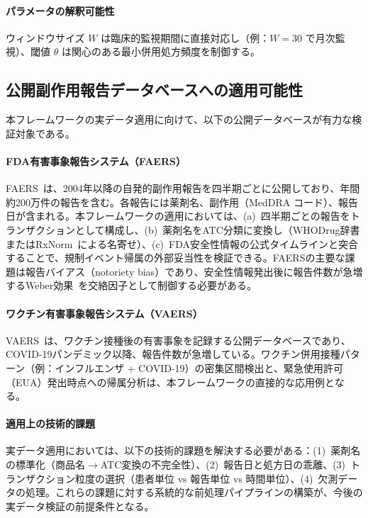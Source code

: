 \documentclass[11pt]{article}
\begin{document}
\paragraph{パラメータの解釈可能性}
ウィンドウサイズ $W$ は臨床的監視期間に直接対応し（例：$W = 30$ で月次監視）、閾値 $\theta$ は関心のある最小併用処方頻度を制御する。

\subsection{公開副作用報告データベースへの適用可能性}\label{sec:public-data}

本フレームワークの実データ適用に向けて、以下の公開データベースが有力な検証対象である。

\paragraph{FDA有害事象報告システム（FAERS）}
FAERS~\citep{fda2024faers}は、2004年以降の自発的副作用報告を四半期ごとに公開しており、年間約200万件の報告を含む。各報告には薬剤名、副作用（MedDRA コード）、報告日が含まれる。本フレームワークの適用においては、(a)~四半期ごとの報告をトランザクションとして構成し、(b)~薬剤名をATC分類に変換し（WHODrug辞書またはRxNorm~\citep{nelson2011rxnorm}による名寄せ）、(c)~FDA安全性情報の公式タイムラインと突合することで、規制イベント帰属の外部妥当性を検証できる。FAERSの主要な課題は報告バイアス（notoriety bias）であり、安全性情報発出後に報告件数が急増するWeber効果~\citep{weber1984epidemiologic}を交絡因子として制御する必要がある。

\paragraph{ワクチン有害事象報告システム（VAERS）}
VAERS~\citep{shimabukuro2015vaers}は、ワクチン接種後の有害事象を記録する公開データベースであり、COVID-19パンデミック以降、報告件数が急増している。ワクチン併用接種パターン（例：インフルエンザ + COVID-19）の密集区間検出と、緊急使用許可（EUA）発出時点への帰属分析は、本フレームワークの直接的な応用例となる。

\paragraph{適用上の技術的課題}
実データ適用においては、以下の技術的課題を解決する必要がある：(1)~薬剤名の標準化（商品名$\to$ATC変換の不完全性）、(2)~報告日と処方日の乖離、(3)~トランザクション粒度の選択（患者単位 vs 報告単位 vs 時間単位）、(4)~欠測データの処理。これらの課題に対する系統的な前処理パイプラインの構築が、今後の実データ検証の前提条件となる。
\end{document}
